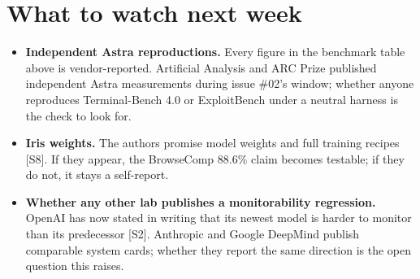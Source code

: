 \documentclass[11pt,a4paper]{article}
\newcommand{\srcref}[1]{\textcolor{brandaccent}{[S#1]}}
\begin{document}
\section{What to watch next week}
\begin{itemize}
  \item \textbf{Independent Astra reproductions.} Every figure in the benchmark table
        above is vendor-reported. Artificial Analysis and ARC Prize published independent Astra
        measurements during issue \#02's window; whether anyone reproduces Terminal-Bench
        4.0 or ExploitBench under a neutral harness is the check to look for.
  \item \textbf{Iris weights.} The authors promise model weights and full training recipes
        \srcref{8}. If they appear, the BrowseComp 88.6\% claim becomes testable; if they
        do not, it stays a self-report.
  \item \textbf{Whether any other lab publishes a monitorability regression.} OpenAI has
        now stated in writing that its newest model is harder to monitor than its
        predecessor \srcref{2}. Anthropic and Google DeepMind publish comparable system
        cards; whether they report the same direction is the open question this raises.
\end{itemize}

\end{document}
